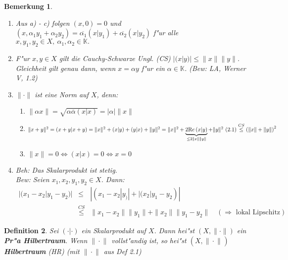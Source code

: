 \documentclass[a4paper,11pt]{book}
\newcommand{\K}{{\mathbb K}}
\newcommand{\begriff}[1]{\textbf{#1}} %
\newcommand{\re}{\ensuremath{\text Re}\,} %
\newcommand{\LN}[1][]{\| \cdot \|_{#1}} %
\newtheorem{Def}{Definition}[chapter]
\newtheorem{Bem}[Def]{Bemerkung}
\theoremstyle{nonumberplain}
\begin{document}
\begin{Bem}\\
\begin{enumerate}

\item Aus a) - c) folgen $(x,0) = 0$ und $(x,\alpha_1 y_1 + \alpha_2 y_2) = \overline{\alpha_1}(x|y_1) + \overline{\alpha_2}(x|y_2)$ f"ur alle $x,y_1,y_2 \in X,\ \alpha_1,\alpha_2 \in \K.$

\item F"ur $x,y \in X$ gilt die Cauchy-Schwarze Ungl. (CS) $|(x|y)| \leq \|x\| \|y\|$. Gleichheit gilt genau dann, wenn $x = \alpha y$ f"ur ein $\alpha \in \K$. (Bew: LA, Werner V, 1.2)

\item $\| \cdot \|$ ist eine Norm auf $X$, denn:
\begin{enumerate}
\item[(i)] $\| \alpha x \| = \sqrt{\alpha \overline{\alpha} (x|x)} = |\alpha| \|x\|$

\item[(ii)] $\| x+y \|^2 = (x+y|x+y) = \|x\|^2 + (x|y) + (y|x) + \|y\|^2 = \|x\|^2 + \underbrace{2 \re (x|y)}_{\leq 2\|x\| \|y\|}+ \|y\|^2 \ (2.1) \stackrel{CS}{\leq} \left( \|x\|+\|y\|\right)^2$

\item[(iii)] $\|x\| = 0 \Leftrightarrow (x|x) = 0 \Leftrightarrow x = 0$
\end{enumerate}

\item \emph{Beh:} Das Skalarprodukt ist stetig.\\
\emph{Bew:} Seien $x_1,x_2,y_1,y_2 \in X$. Dann:
\begin{eqnarray}
|(x_1-x_2|y_1-y_2)| & \leq & |(x_1-x_2|y_)| + |(x_2|y_1-y_2)| \\
& \stackrel{CS}{\leq} & \|x_1 - x_2\| \|y_1\| + \|x_2\| \|y_1-y_2\| \quad (\Rightarrow \text{ lokal Lipschitz})
\end{eqnarray}

\end{enumerate}
\end{Bem}

\begin{Def}
Sei $(\cdot|\cdot)$ ein Skalarprodukt auf $X$. Dann hei"st $(X, \| \cdot \|)$ ein \begriff{Pr"a Hilbertraum}. Wenn $\LN$ vollst"andig ist, so hei"st $(X,\LN)$ \begriff{Hilbertraum} (HR) (mit $\LN$ aus Def 2.1)
\end{Def}
\end{document}
